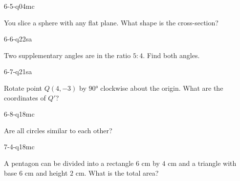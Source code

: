 \begin{practiceQuestion}{6-5-q04}{mc}
\begin{questionText}
You slice a sphere with any flat plane. What shape is the cross-section?
\end{questionText}
\end{practiceQuestion}

\begin{practiceQuestion}{6-6-q22}{sa}
\begin{questionText}
Two supplementary angles are in the ratio $5:4$. Find both angles.
\end{questionText}
\end{practiceQuestion}

\begin{practiceQuestion}{6-7-q21}{sa}
\begin{questionText}
Rotate point $Q(4, -3)$ by $90°$ clockwise about the origin. What are the coordinates of $Q'$?
\end{questionText}
\end{practiceQuestion}

\begin{practiceQuestion}{6-8-q18}{mc}
\begin{questionText}
Are all circles similar to each other?
\end{questionText}
\end{practiceQuestion}

\begin{practiceQuestion}{7-4-q18}{mc}
\begin{questionText}
A pentagon can be divided into a rectangle $6$ cm by $4$ cm and a triangle with base $6$ cm and height $2$ cm. What is the total area?
\end{questionText}
\end{practiceQuestion}

